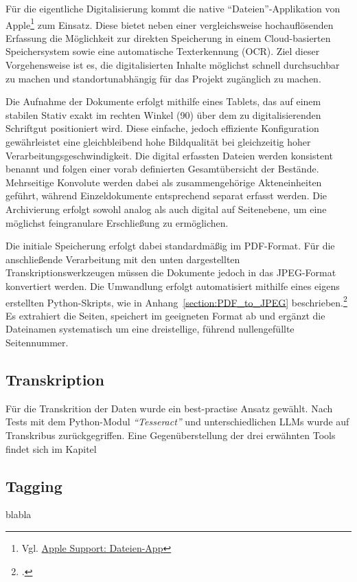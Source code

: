 \documentclass[12pt, a4paper, ngerman, bidi=default]{article}
\begin{document}
Für die eigentliche Digitalisierung kommt die native \enquote{Dateien}-Applikation von 
Apple\footnote{Vgl. \href{https://support.apple.com/de-de/guide/preview/prvw28034/mac}{Apple Support: Dateien-App}} zum Einsatz. 
Diese bietet neben einer vergleichsweise hochauflösenden Erfassung die Möglichkeit zur direkten Speicherung in einem Cloud-basierten 
Speichersystem sowie eine automatische Texterkennung (OCR). Ziel dieser Vorgehensweise ist es, die digitalisierten Inhalte möglichst 
schnell durchsuchbar zu machen und standortunabhängig für das Projekt zugänglich zu machen.

Die Aufnahme der Dokumente erfolgt mithilfe eines Tablets, das auf einem stabilen Stativ exakt im rechten Winkel (90\textdegree)
über dem zu digitalisierenden Schriftgut positioniert wird. Diese einfache, jedoch effiziente Konfiguration gewährleistet eine 
gleichbleibend hohe Bildqualität bei gleichzeitig hoher Verarbeitungsgeschwindigkeit. Die digital erfassten Dateien werden konsistent
 benannt und folgen einer vorab definierten Gesamtübersicht der Bestände. Mehrseitige Konvolute werden dabei als zusammengehörige 
 Akteneinheiten geführt, während Einzeldokumente entsprechend separat erfasst werden. Die Archivierung erfolgt sowohl analog als auch 
 digital auf Seitenebene, um eine möglichst feingranulare Erschließung zu ermöglichen.

Die initiale Speicherung erfolgt dabei standardmäßig im PDF-Format. Für die anschließende Verarbeitung mit den unten dargestellten 
Transkriptionswerkzeugen müssen die Dokumente jedoch in das JPEG-Format konvertiert werden. Die Umwandlung erfolgt automatisiert 
mithilfe eines eigens erstellten Python-Skripts, wie in Anhang~\ref{section:PDF_to_JPEG} beschrieben.\footcite{burkhardt_githubpdf_to_jpegpy_2025}
Es extrahiert die Seiten, speichert im geeigneten 
Format ab und ergänzt die Dateinamen systematisch um eine dreistellige, führend nullengefüllte Seitennummer.

\subsection{Transkription}
Für die Transkrition der Daten wurde ein best-practise Ansatz gewählt. Nach Tests mit dem Python-Modul \textit{\enquote{Tesseract}} 
und unterschiedlichen LLMs wurde auf Transkribus zurückgegriffen. Eine Gegenüberstellung der drei erwähnten Tools findet 
sich im Kapitel~

\subsection{Tagging}
blabla
\end{document}
